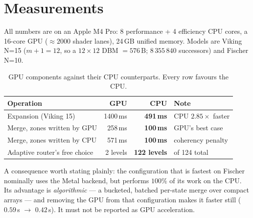 \section{Measurements}
\label{sec:meas}

All numbers are on an Apple M4 Pro: 8 performance + 4 efficiency CPU cores, a 16-core GPU
(${\approx}2000$ shader lanes), 24\,GB unified memory. Models are Viking N=15
($m{+}1=12$, so a $12\times12$ DBM $=576$\,B; $8\,355\,840$ successors) and Fischer N=10.

\begin{table}[t]
\centering
\caption{GPU components against their CPU counterparts. Every row favours the CPU.}
\label{tab:head}
\begin{tabular}{lrrl}
\toprule
Operation & GPU & CPU & Note \\
\midrule
Expansion (Viking 15) & 1400\,ms & \textbf{491\,ms} & CPU $2.85\times$ faster \\
Merge, zones written by GPU & 258\,ms & \textbf{100\,ms} & GPU's best case \\
Merge, zones written by CPU & 571\,ms & \textbf{100\,ms} & coherency penalty \\
Adaptive router's free choice & 2 levels & \textbf{122 levels} & of 124 total \\
\bottomrule
\end{tabular}
\end{table}

A consequence worth stating plainly: the configuration that is fastest on Fischer nominally
uses the Metal backend, but performs $100\%$ of its work on the CPU. Its advantage is
\emph{algorithmic} --- a bucketed, batched per-state merge over compact arrays --- and
removing the GPU from that configuration makes it faster still ($0.59$\,s $\to$ $0.42$\,s).
It must not be reported as GPU acceleration.
